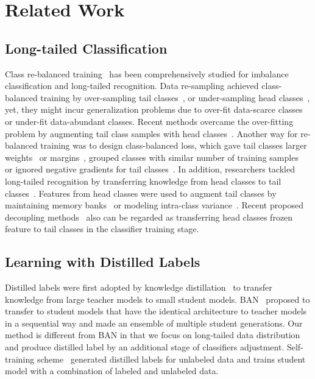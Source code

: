 \documentclass[10pt,twocolumn,letterpaper]{article}
\begin{document}
\section{Related Work}

\subsection{Long-tailed Classification}
Class re-balanced training~\cite{oversample_2, costsensitive, LDAM, undersampling_1, reweight_2, domainadpation} has been comprehensively studied for imbalance classification and long-tailed recognition. Data re-sampling achieved class-balanced training by over-sampling tail classes~\cite{oversampling_1, oversample_2, featureaugmentation, oversampling_3}, or under-sampling head classes~\cite{undersampling_1, undersampling_2}, yet, they might incur generalization problems due to over-fit data-scarce classes or under-fit data-abundant classes. Recent methods overcame the over-fitting problem by augmenting tail class samples with head classes~\cite{featureaugmentation, M2m}. Another way for re-balanced training was to design class-balanced loss, which gave tail classes larger weights~\cite{effectivenumber, costsensitive, reweight_1, reweight_2} or margins~\cite{LDAM}, grouped classes with similar number of training samples~\cite{groupbalancesoftmax} or ignored negative gradients for tail classes~\cite{equalization}. In addition, researchers tackled long-tailed recognition by transferring knowledge from head classes to tail classes~\cite{OLTR, inflatedmemory, yin2019feature, decoupling, bbn}. Features from head classes were used to augment tail classes by maintaining memory banks~\cite{OLTR, inflatedmemory} or modeling intra-class variance~\cite{yin2019feature}. Recent proposed decoupling methods~\cite{decoupling, bbn} also can be regarded as transferring head classes frozen feature to tail classes in the classifier training stage.

\subsection{Learning with Distilled Labels}
Distilled labels were first adopted by knowledge distillation~\cite{kd_hinton} to transfer knowledge from large teacher models to small student models. BAN~\cite{BAN} proposed to transfer to student models that have the identical architecture to teacher models in a sequential way and made an ensemble of multiple student generations. Our method is different from BAN in that we focus on long-tailed data distribution and produce distilled label by an additional stage of classifiers adjustment. Self-training scheme~\cite{selftraining} generated distilled labels for unlabeled data and trains student model with a combination of labeled and unlabeled data.
\end{document}
